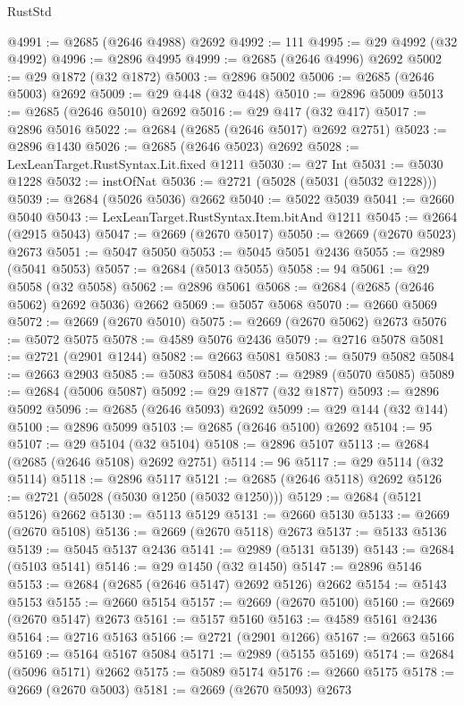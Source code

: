 \begin{lexlean}{RustStd}
\begin{coremodule}
@4991 := @2685 (@2646 @4988) @2692
@4992 := 111
@4995 := @29 @4992 (@32 @4992)
@4996 := @2896 @4995
@4999 := @2685 (@2646 @4996) @2692
@5002 := @29 @1872 (@32 @1872)
@5003 := @2896 @5002
@5006 := @2685 (@2646 @5003) @2692
@5009 := @29 @448 (@32 @448)
@5010 := @2896 @5009
@5013 := @2685 (@2646 @5010) @2692
@5016 := @29 @417 (@32 @417)
@5017 := @2896 @5016
@5022 := @2684 (@2685 (@2646 @5017) @2692 @2751)
@5023 := @2896 @1430
@5026 := @2685 (@2646 @5023) @2692
@5028 := LexLeanTarget.RustSyntax.Lit.fixed @1211
@5030 := @27 Int
@5031 := @5030 @1228
@5032 := instOfNat
@5036 := @2721 (@5028 (@5031 (@5032 @1228)))
@5039 := @2684 (@5026 @5036) @2662
@5040 := @5022 @5039
@5041 := @2660 @5040
@5043 := LexLeanTarget.RustSyntax.Item.bitAnd @1211
@5045 := @2664 (@2915 @5043)
@5047 := @2669 (@2670 @5017)
@5050 := @2669 (@2670 @5023) @2673
@5051 := @5047 @5050
@5053 := @5045 @5051 @2436
@5055 := @2989 (@5041 @5053)
@5057 := @2684 (@5013 @5055)
@5058 := 94
@5061 := @29 @5058 (@32 @5058)
@5062 := @2896 @5061
@5068 := @2684 (@2685 (@2646 @5062) @2692 @5036) @2662
@5069 := @5057 @5068
@5070 := @2660 @5069
@5072 := @2669 (@2670 @5010)
@5075 := @2669 (@2670 @5062) @2673
@5076 := @5072 @5075
@5078 := @4589 @5076 @2436
@5079 := @2716 @5078
@5081 := @2721 (@2901 @1244)
@5082 := @2663 @5081
@5083 := @5079 @5082
@5084 := @2663 @2903
@5085 := @5083 @5084
@5087 := @2989 (@5070 @5085)
@5089 := @2684 (@5006 @5087)
@5092 := @29 @1877 (@32 @1877)
@5093 := @2896 @5092
@5096 := @2685 (@2646 @5093) @2692
@5099 := @29 @144 (@32 @144)
@5100 := @2896 @5099
@5103 := @2685 (@2646 @5100) @2692
@5104 := 95
@5107 := @29 @5104 (@32 @5104)
@5108 := @2896 @5107
@5113 := @2684 (@2685 (@2646 @5108) @2692 @2751)
@5114 := 96
@5117 := @29 @5114 (@32 @5114)
@5118 := @2896 @5117
@5121 := @2685 (@2646 @5118) @2692
@5126 := @2721 (@5028 (@5030 @1250 (@5032 @1250)))
@5129 := @2684 (@5121 @5126) @2662
@5130 := @5113 @5129
@5131 := @2660 @5130
@5133 := @2669 (@2670 @5108)
@5136 := @2669 (@2670 @5118) @2673
@5137 := @5133 @5136
@5139 := @5045 @5137 @2436
@5141 := @2989 (@5131 @5139)
@5143 := @2684 (@5103 @5141)
@5146 := @29 @1450 (@32 @1450)
@5147 := @2896 @5146
@5153 := @2684 (@2685 (@2646 @5147) @2692 @5126) @2662
@5154 := @5143 @5153
@5155 := @2660 @5154
@5157 := @2669 (@2670 @5100)
@5160 := @2669 (@2670 @5147) @2673
@5161 := @5157 @5160
@5163 := @4589 @5161 @2436
@5164 := @2716 @5163
@5166 := @2721 (@2901 @1266)
@5167 := @2663 @5166
@5169 := @5164 @5167 @5084
@5171 := @2989 (@5155 @5169)
@5174 := @2684 (@5096 @5171) @2662
@5175 := @5089 @5174
@5176 := @2660 @5175
@5178 := @2669 (@2670 @5003)
@5181 := @2669 (@2670 @5093) @2673

\end{coremodule}
\end{lexlean}
